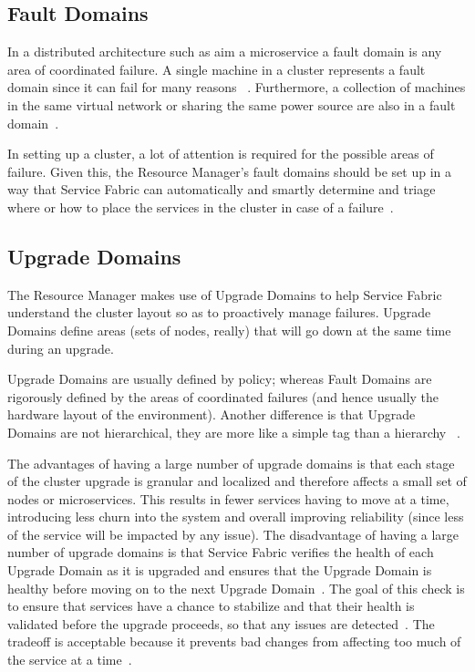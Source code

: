 \subsection{Fault Domains}
In a distributed architecture such as aim a microservice a fault
domain is any area of coordinated failure. A single machine in a cluster
represents a fault domain since it can fail for many reasons
~\cite{hid-sp18-501-description}. 
Furthermore, a collection of
machines in the same virtual network or sharing the same power source
are also in a fault domain~\cite{hid-sp18-501-description}.

In setting up a cluster, a lot of attention is required for the
possible areas of failure. Given this, the Resource Manager's fault 
domains should be set
up in a way that Service Fabric can automatically and smartly determine and
triage where or how to place the services in the cluster in case of a
failure~\cite{hid-sp18-501-fig2and3}.

\subsection{Upgrade Domains}
The Resource Manager makes use of Upgrade Domains to help Service Fabric
understand the cluster layout so as to proactively manage failures. 
Upgrade Domains define areas (sets of
nodes, really) that will go down at the same time during an upgrade.

Upgrade Domains are usually defined by policy;
whereas Fault Domains are rigorously defined by the areas of
coordinated failures (and hence usually the hardware layout of the
environment). Another difference is that Upgrade Domains are not
hierarchical, they are more like a simple tag than a hierarchy
~\cite{hid-sp18-501-fig2and3}.

The advantages of having a large number of upgrade domains is that
each stage of the cluster upgrade is granular and localized and
therefore affects a small set of nodes or microservices. This results
in fewer services having to move at a time, introducing less churn
into the system and overall improving reliability (since less of the
service will be impacted by any issue).  The disadvantage of having a
large number of upgrade domains is that Service Fabric verifies the
health of each Upgrade Domain as it is upgraded and ensures that the
Upgrade Domain is healthy before moving on to the next Upgrade
Domain~\cite{hid-sp18-501-fig2and3}.  The goal of this check is to
ensure that services have a chance to stabilize and that their health
is validated before the upgrade proceeds, so that any issues are
detected~\cite{hid-sp18-501-fig2and3}.  The tradeoff is acceptable
because it prevents bad changes from affecting too much of the service
at a time~\cite{hid-sp18-501-fig2and3}.

